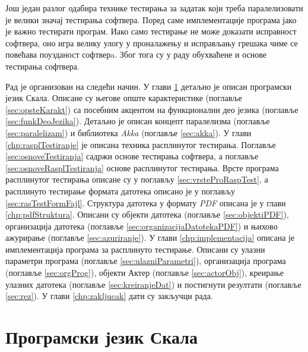 \documentclass[12pt,oneside]{memoir}
\begin{document}
Још један разлог одабира технике тестирања за задатак који треба паралелизовати је велики значај тестирања софтвера. Поред саме имплементације програма јако је важно тестирати програм. Иако само тестирање не може доказати исправност софтвера, оно игра велику улогу у проналажењу и исправљању грешака чиме се повећава поузданост софтверa. Због тога су у раду обухваћене и основе тестирања софтвера.

Рад је организован на следећи начин. У глави \ref{chp:skala} детаљно је описан програмски језик Скала. Описане су његове опште карактеристике (поглавље \ref{sec:opsteKarakt}) са посебним акцентом на функционални део језика (поглавље \ref{sec:funkDeoJezika}). Детаљно је описан концепт паралелизма (поглавље \ref{sec:paralelizam}) и библиотека \textit{Akka} (поглавље \ref{sec:akka}). У глави \ref{chp:rasplTestiranje} је описана техника расплинутог тестирања. Поглавље \ref{sec:osnoveTestiranja} садржи основе тестирања софтвера, а поглавље \ref{sec:osnoveRasplTestiranja} основе расплинутог тестирања. Врсте програма расплинутог тестирања описане су у поглављу \ref{sec:vrsteProRaspTest}, а расплинуто тестирање формата датотека описано је у поглављу \ref{sec:rasTestFormFajl}. Структура датотека у формату \textit{PDF} описана је у глави \ref{chp:pdfStruktura}. Описани су објекти датотека (поглавље \ref{sec:objektiPDF}), организација датотека (поглавље \ref{sec:organizacijaDatotekaPDF}) и њихово ажурирање (поглавље \ref{sec:azuriranje}). У глави \ref{chp:implementacija} описана је имплементација програма за расплинуто тестирање. Описани су улазни параметри програма (поглавље \ref{sec:ulazniParametri}), организација програма (поглавље \ref{sec:orgProg}), објекти Актер (поглавље \ref{sec:actorObj}), креирање улазних датотека (поглавље \ref{sec:kreiranjeDat}) и постигнути резултати (поглавље \ref{sec:rez}). У глави \ref{chp:zakljucak} дати су закључци рада. 


\chapter{Програмски језик Скала}
\label{chp:skala}
\end{document}
